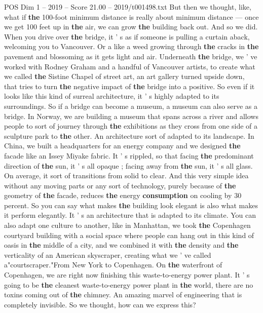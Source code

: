 \begin{textsample}{POS Dim 1 – 2019 – Score 21.00 – 2019/t001498.txt}
But then we thought, like, what if \textbf{the} 100-foot minimum distance is really about minimum distance — once we get 100 feet up in \textbf{the} air, we can grow \textbf{the} building back out.
And so we did.
When you drive over \textbf{the} bridge, it ' s as if someone is pulling a curtain aback, welcoming you to Vancouver.
Or a like a weed growing through \textbf{the} cracks in \textbf{the} pavement and blossoming as it gets light and air.
Underneath \textbf{the} bridge, we ' ve worked with Rodney Graham and a handful of Vancouver artists, to create what we called \textbf{the} Sistine Chapel of street art, an art gallery turned upside down, that tries to turn \textbf{the} negative impact of \textbf{the} bridge into a positive.
So even if it looks like this kind of surreal architecture, it ' s highly adapted to its surroundings.
So if a bridge can become a museum, a museum can also serve as a bridge.
In Norway, we are building a museum that spans across a river and allows people to sort of journey through \textbf{the} exhibitions as they cross from one side of a sculpture park to \textbf{the} other.
An architecture sort of adapted to its landscape.
In China, we built a headquarters for an energy company and we designed \textbf{the} facade like an Issey Miyake fabric.
It ' s rippled, so that facing \textbf{the} predominant direction of \textbf{the} sun, it ' s all opaque ; facing away from \textbf{the} sun, it ' s all glass.
On average, it sort of transitions from solid to clear.
And this very simple idea without any moving parts or any sort of technology, purely because of \textbf{the} geometry of \textbf{the} facade, reduces \textbf{the} energy \textbf{consumption} on cooling by 30 percent.
So you can say what makes \textbf{the} building look elegant is also what makes it perform elegantly.
It ' s an architecture that is adapted to its climate.
You can also adapt one culture to another, like in Manhattan, we took \textbf{the} Copenhagen courtyard building with a social space where people can hang out in this kind of oasis in \textbf{the} middle of a city, and we combined it with \textbf{the} density and \textbf{the} verticality of an American skyscraper, creating what we ' ve called a"courtscraper."From New York to Copenhagen.
On \textbf{the} waterfront of Copenhagen, we are right now finishing this waste-to-energy power plant.
It ' s going to be \textbf{the} cleanest waste-to-energy power plant in \textbf{the} world, there are no toxins coming out of \textbf{the} chimney.
An amazing marvel of engineering that is completely invisible.
So we thought, how can we express this?

\end{textsample}

